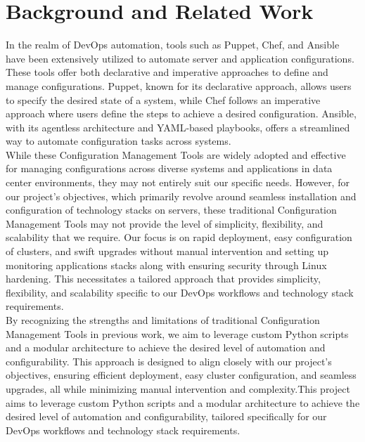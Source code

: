 \documentclass[12pt,a4paper,oneside]{report}
\begin{document}
 
\newpage
\chapter{Background and Related Work}

In the realm of DevOps automation, tools such as Puppet, Chef, and Ansible have been extensively utilized to automate server and application configurations. These tools offer both declarative and imperative approaches to define and manage configurations. Puppet, known for its declarative approach, allows users to specify the desired state of a system, while Chef follows an imperative approach where users define the steps to achieve a desired configuration. Ansible, with its agentless architecture and YAML-based playbooks, offers a streamlined way to automate configuration tasks across systems. \\

  While these Configuration Management Tools are widely adopted and effective for managing configurations across diverse systems and applications in data center environments, they may not entirely suit our specific needs.
However, for our project's objectives, which primarily revolve around seamless installation and configuration of technology stacks on servers, these traditional Configuration Management Tools may not provide the level of simplicity, flexibility, and scalability that we require. Our focus is on rapid deployment, easy configuration of clusters, and swift upgrades without manual intervention and setting up monitoring applications stacks along with ensuring security through Linux hardening. This necessitates a tailored approach that provides simplicity, flexibility, and scalability specific to our DevOps workflows and technology stack requirements. \\

By recognizing the strengths and limitations of traditional Configuration Management Tools in previous work, we aim to leverage custom Python scripts and a modular architecture to achieve the desired level of automation and configurability. This approach is designed to align closely with our project's objectives, ensuring efficient deployment, easy cluster configuration, and seamless upgrades, all while minimizing manual intervention and complexity.This project aims to leverage custom Python scripts and a modular architecture to achieve the desired level of automation and configurability, tailored specifically for our DevOps workflows and technology stack requirements.
\end{document}
